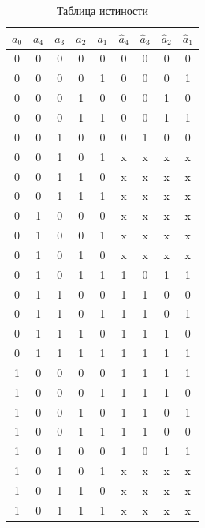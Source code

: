 \documentclass[a4paper,14pt]{article}
\begin{document}
\begin{table}[H]
				\begin{center}
		\caption{\label{tab:tabl_preobr} Таблица истиности}
	\begin{tabular}{|c|c|c|c|c|c|c|c|c|}
		\hline
		$a_0$ & $a_4$ & $a_3$ & $a_2$ & $a_1$ & $\hat{a}_4$ & $\hat{a}_3$ & $\hat{a}_2$ & $\hat{a}_1$ \\ \hline
		0  & 0  & 0  & 0  & 0  & 0 & 0 & 0 & 0  \\ \hline
		0  & 0  & 0  & 0  & 1  & 0 & 0 & 0 & 1  \\ \hline
		0  & 0  & 0  & 1  & 0  & 0 & 0 & 1 & 0  \\ \hline
		0  & 0  & 0  & 1  & 1  & 0 & 0 & 1 & 1  \\ \hline
		0  & 0  & 1  & 0  & 0  & 0 & 1 & 0 & 0  \\ \hline
		0  & 0  & 1  & 0  & 1  & x & x & x & x  \\ \hline
		0  & 0  & 1  & 1  & 0  & x & x & x & x  \\ \hline
		0  & 0  & 1  & 1  & 1  & x & x & x & x  \\ \hline
		0  & 1  & 0  & 0  & 0  & x & x & x & x  \\ \hline
		0  & 1  & 0  & 0  & 1  & x & x & x & x  \\ \hline
		0  & 1  & 0  & 1  & 0  & x & x & x & x  \\ \hline
		0  & 1  & 0  & 1  & 1  & 1 & 0 & 1 & 1  \\ \hline
		0  & 1  & 1  & 0  & 0  & 1 & 1 & 0 & 0  \\ \hline
		0  & 1  & 1  & 0  & 1  & 1 & 1 & 0 & 1  \\ \hline
		0  & 1  & 1  & 1  & 0  & 1 & 1 & 1 & 0  \\ \hline
		0  & 1  & 1  & 1  & 1  & 1 & 1 & 1 & 1  \\ \hline
		1  & 0  & 0  & 0  & 0  & 1 & 1 & 1 & 1  \\ \hline
		1  & 0  & 0  & 0  & 1  & 1 & 1 & 1 & 0  \\ \hline
		1  & 0  & 0  & 1  & 0  & 1 & 1 & 0 & 1  \\ \hline
		1  & 0  & 0  & 1  & 1  & 1 & 1 & 0 & 0  \\ \hline
		1  & 0  & 1  & 0  & 0  & 1 & 0 & 1 & 1  \\ \hline
		1  & 0  & 1  & 0  & 1  & x & x & x & x  \\ \hline
		1  & 0  & 1  & 1  & 0  & x & x & x & x  \\ \hline
		1  & 0  & 1  & 1  & 1  & x & x & x & x  \\ \hline

\end{tabular}
\end{center}
\end{table}
\end{document}
